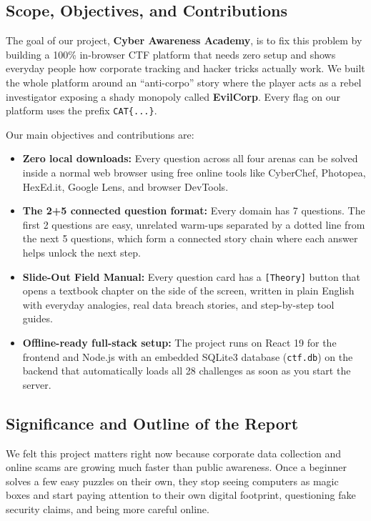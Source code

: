 \documentclass[11pt,a4paper]{article}
\begin{document}
\subsection{Scope, Objectives, and Contributions}
The goal of our project, \textbf{Cyber Awareness Academy}, is to fix this problem by building a 100\% in-browser CTF platform that needs zero setup and shows everyday people how corporate tracking and hacker tricks actually work. We built the whole platform around an ``anti-corpo'' story where the player acts as a rebel investigator exposing a shady monopoly called \textbf{EvilCorp}. Every flag on our platform uses the prefix \texttt{CAT\{...\}}.

Our main objectives and contributions are:
\begin{itemize}
    \item \textbf{Zero local downloads:} Every question across all four arenas can be solved inside a normal web browser using free online tools like CyberChef, Photopea, HexEd.it, Google Lens, and browser DevTools.
    \item \textbf{The 2+5 connected question format:} Every domain has 7 questions. The first 2 questions are easy, unrelated warm-ups separated by a dotted line from the next 5 questions, which form a connected story chain where each answer helps unlock the next step.
    \item \textbf{Slide-Out Field Manual:} Every question card has a \texttt{[Theory]} button that opens a textbook chapter on the side of the screen, written in plain English with everyday analogies, real data breach stories, and step-by-step tool guides.
    \item \textbf{Offline-ready full-stack setup:} The project runs on React 19 for the frontend and Node.js with an embedded SQLite3 database (\texttt{ctf.db}) on the backend that automatically loads all 28 challenges as soon as you start the server.
\end{itemize}

\subsection{Significance and Outline of the Report}
We felt this project matters right now because corporate data collection and online scams are growing much faster than public awareness. Once a beginner solves a few easy puzzles on their own, they stop seeing computers as magic boxes and start paying attention to their own digital footprint, questioning fake security claims, and being more careful online.
\end{document}
